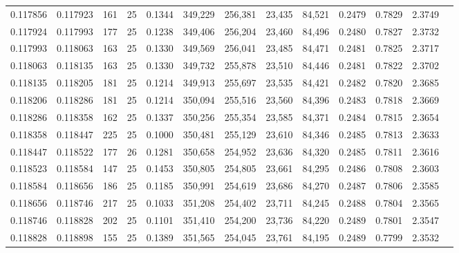 \begin{tabular}{rrrrrrrrrrrrr}
0.117856 & 0.117923 &   161 &  25 &                                     0.1344 & 349,229 & 256,381 &  23,435 &  84,521 & 0.2479 & 0.7829 & 2.3749 \\
0.117924 & 0.117993 &   177 &  25 &                                     0.1238 & 349,406 & 256,204 &  23,460 &  84,496 & 0.2480 & 0.7827 & 2.3732 \\
0.117993 & 0.118063 &   163 &  25 &                                     0.1330 & 349,569 & 256,041 &  23,485 &  84,471 & 0.2481 & 0.7825 & 2.3717 \\
0.118063 & 0.118135 &   163 &  25 &                                     0.1330 & 349,732 & 255,878 &  23,510 &  84,446 & 0.2481 & 0.7822 & 2.3702 \\
0.118135 & 0.118205 &   181 &  25 &                                     0.1214 & 349,913 & 255,697 &  23,535 &  84,421 & 0.2482 & 0.7820 & 2.3685 \\
0.118206 & 0.118286 &   181 &  25 &                                     0.1214 & 350,094 & 255,516 &  23,560 &  84,396 & 0.2483 & 0.7818 & 2.3669 \\
0.118286 & 0.118358 &   162 &  25 &                                     0.1337 & 350,256 & 255,354 &  23,585 &  84,371 & 0.2484 & 0.7815 & 2.3654 \\
0.118358 & 0.118447 &   225 &  25 &                                     0.1000 & 350,481 & 255,129 &  23,610 &  84,346 & 0.2485 & 0.7813 & 2.3633 \\
0.118447 & 0.118522 &   177 &  26 &                                     0.1281 & 350,658 & 254,952 &  23,636 &  84,320 & 0.2485 & 0.7811 & 2.3616 \\
0.118523 & 0.118584 &   147 &  25 &                                     0.1453 & 350,805 & 254,805 &  23,661 &  84,295 & 0.2486 & 0.7808 & 2.3603 \\
0.118584 & 0.118656 &   186 &  25 &                                     0.1185 & 350,991 & 254,619 &  23,686 &  84,270 & 0.2487 & 0.7806 & 2.3585 \\
0.118656 & 0.118746 &   217 &  25 &                                     0.1033 & 351,208 & 254,402 &  23,711 &  84,245 & 0.2488 & 0.7804 & 2.3565 \\
0.118746 & 0.118828 &   202 &  25 &                                     0.1101 & 351,410 & 254,200 &  23,736 &  84,220 & 0.2489 & 0.7801 & 2.3547 \\
0.118828 & 0.118898 &   155 &  25 &                                     0.1389 & 351,565 & 254,045 &  23,761 &  84,195 & 0.2489 & 0.7799 & 2.3532 \\

\end{tabular}
